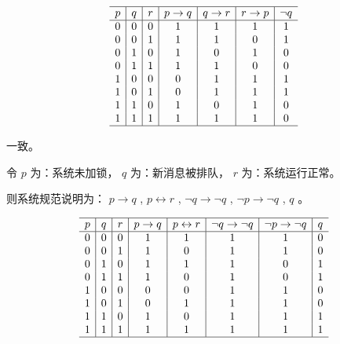{{\begin{practices}
            \begin{table}[H]
                \[
                    \begin{array}{c|c|c|c|c|c|c}
                        \hline
                        p & q & r & p \rightarrow q & q \rightarrow r & r \rightarrow p & \neg q \\
                        \hline
                        0 & 0 & 0 & 1 & 1 & 1 & 1 \\
                        0 & 0 & 1 & 1 & 1 & 0 & 1 \\
                        0 & 1 & 0 & 1 & 0 & 1 & 0 \\
                        0 & 1 & 1 & 1 & 1 & 0 & 0 \\
                        1 & 0 & 0 & 0 & 1 & 1 & 1 \\
                        1 & 0 & 1 & 0 & 1 & 1 & 1 \\
                        1 & 1 & 0 & 1 & 0 & 1 & 0 \\
                        1 & 1 & 1 & 1 & 1 & 1 & 0 \\
                        \hline
                    \end{array}
                \]
            \end{table}

            一致。
        \end{practices}

        \begin{practices}
            令 $p$ 为：系统未加锁， $q$ 为：新消息被排队， $r$ 为：系统运行正常。

            则系统规范说明为： $p \rightarrow q$ , $p \leftrightarrow r$ , $\neg q \rightarrow \neg q$ , $\neg p \rightarrow \neg q$ , $q$ 。

            \begin{table}[H]
                \[
                    \begin{array}{c|c|c|c|c|c|c|c}
                        \hline
                        p & q & r & p \rightarrow q & p \leftrightarrow r & \neg q \rightarrow \neg q & \neg p \rightarrow \neg q & q \\
                        \hline
                        0 & 0 & 0 & 1 & 1 & 1 & 1 & 0 \\
                        0 & 0 & 1 & 1 & 0 & 1 & 1 & 0 \\
                        0 & 1 & 0 & 1 & 1 & 1 & 0 & 1 \\
                        0 & 1 & 1 & 1 & 0 & 1 & 0 & 1 \\
                        1 & 0 & 0 & 0 & 0 & 1 & 1 & 0 \\
                        1 & 0 & 1 & 0 & 1 & 1 & 1 & 0 \\
                        1 & 1 & 0 & 1 & 0 & 1 & 1 & 1 \\
                        1 & 1 & 1 & 1 & 1 & 1 & 1 & 1 \\
                        \hline
                    \end{array}
                \]
            \end{table}


\end{practices}}}
